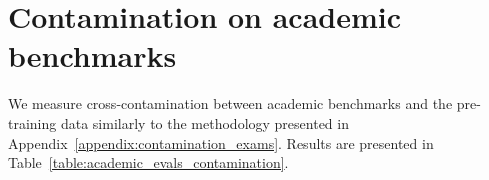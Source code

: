 \documentclass{article}
\begin{document}
\begin{table}[htbp]
{\begin{tabular}[]
\bottomrule
\end{tabular}}
\caption{Contamination data for Exams (Details). Detailed contamination information on each of the exams tested are shown in this table, listed from most-to-least contaminated. Exams with both multiple choice questions (MCQ) and free-response questions (FRQ) are split into separate rows. For each set, we list the number of questions and fraction which are contaminated (appear in the training set). We then report GPT-4's performance (as percentage of max score) on the overall set, on the non-contaminated questions, and on only the contaminated set. The degradation (non-contaminated percent minus contaminated) is generally small and as often positive as negative, from which we conclude that contamination is not a substantive confounder on the overall results.}
\label{table:contam_details}
\end{table}



\section{Contamination on academic benchmarks}
\label{appendix:contamination}

We measure cross-contamination between academic benchmarks and the pre-training data similarly to the methodology presented in Appendix~\ref{appendix:contamination_exams}. Results are presented in Table~\ref{table:academic_evals_contamination}.
\end{document}
